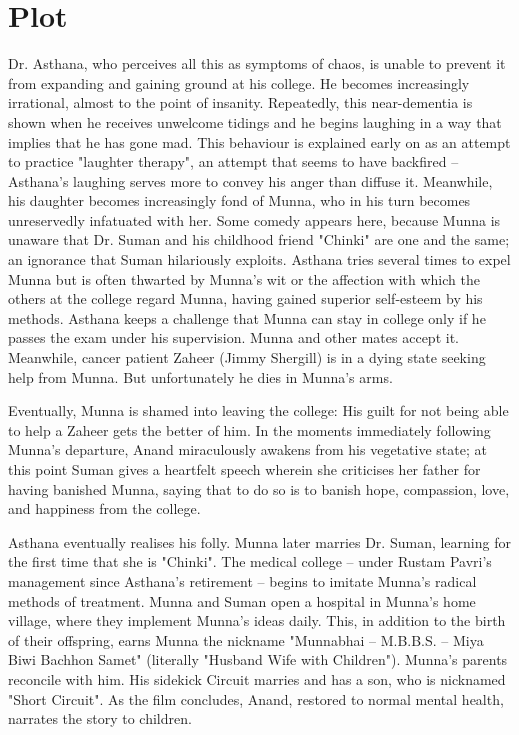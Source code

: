 \documentclass[]{article}
\begin{document}
	\section{Plot}
	Dr. Asthana, who perceives all this as symptoms of chaos, is unable to prevent it from expanding and gaining ground at his college. He becomes increasingly irrational, almost to the point of insanity. Repeatedly, this near-dementia is shown when he receives unwelcome tidings and he begins laughing in a way that implies that he has gone mad. This behaviour is explained early on as an attempt to practice "laughter therapy", an attempt that seems to have backfired – Asthana's laughing serves more to convey his anger than diffuse it. Meanwhile, his daughter becomes increasingly fond of Munna, who in his turn becomes unreservedly infatuated with her. Some comedy appears here, because Munna is unaware that Dr. Suman and his childhood friend "Chinki" are one and the same; an ignorance that Suman hilariously exploits. Asthana tries several times to expel Munna but is often thwarted by Munna's wit or the affection with which the others at the college regard Munna, having gained superior self-esteem by his methods. Asthana keeps a challenge that Munna can stay in college only if he passes the exam under his supervision. Munna and other mates accept it. Meanwhile, cancer patient Zaheer (Jimmy Shergill) is in a dying state seeking help from Munna. But unfortunately he dies in Munna's arms.

Eventually, Munna is shamed into leaving the college: His guilt for not being able to help a Zaheer gets the better of him. In the moments immediately following Munna's departure, Anand miraculously awakens from his vegetative state; at this point Suman gives a heartfelt speech wherein she criticises her father for having banished Munna, saying that to do so is to banish hope, compassion, love, and happiness from the college.

Asthana eventually realises his folly. Munna later marries Dr. Suman, learning for the first time that she is "Chinki". The medical college – under Rustam Pavri's management since Asthana's retirement – begins to imitate Munna's radical methods of treatment. Munna and Suman open a hospital in Munna's home village, where they implement Munna's ideas daily. This, in addition to the birth of their offspring, earns Munna the nickname "Munnabhai – M.B.B.S. – Miya Biwi Bachhon Samet" (literally "Husband Wife with Children"). Munna's parents reconcile with him. His sidekick Circuit marries and has a son, who is nicknamed "Short Circuit". As the film concludes, Anand, restored to normal mental health, narrates the story to children.
\end{document}
